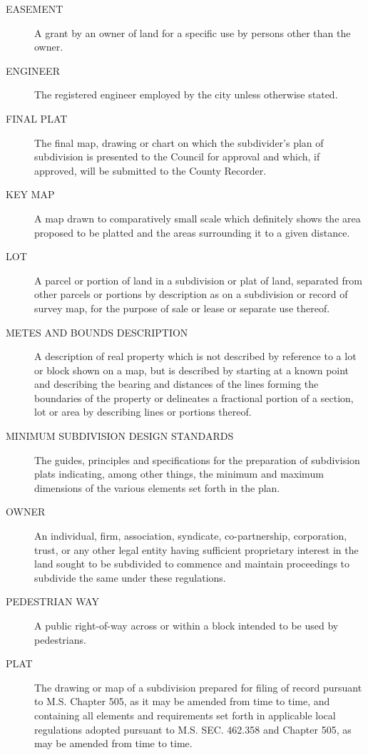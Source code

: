 \begin{description}
    \item[EASEMENT] A grant by an owner of land for a specific use by persons other than the owner.
    \item[ENGINEER] The registered engineer employed by the city unless otherwise stated.
    \item[FINAL PLAT] The final map, drawing or chart on which the subdivider’s plan of subdivision is presented to the Council for approval and which, if approved, will be submitted to the County Recorder.
    \item[KEY MAP] A map drawn to comparatively small scale which definitely shows the area proposed to be platted and the areas surrounding it to a given distance.
    \item[LOT] A parcel or portion of land in a subdivision or plat of land, separated from other parcels or portions by description as on a subdivision or record of survey map, for the purpose of sale or lease or separate use thereof.
    \item[METES AND BOUNDS DESCRIPTION] A description of real property which is not described by reference to a lot or block shown on a map, but is described by starting at a known point and describing the bearing and distances of the lines forming the boundaries of the property or delineates a fractional portion of a section, lot or area by describing lines or portions thereof.
    \item[MINIMUM SUBDIVISION DESIGN STANDARDS] The guides, principles and specifications for the preparation of subdivision plats indicating, among other things, the minimum and maximum dimensions of the various elements set forth in the plan.
    \item[OWNER] An individual, firm, association, syndicate, co-partnership, corporation, trust, or any other legal entity having sufficient proprietary interest in the land sought to be subdivided to commence and maintain proceedings to subdivide the same under these regulations.
    \item[PEDESTRIAN WAY] A public right-of-way across or within a block intended to be used by pedestrians.
    \item[PLAT] The drawing or map of a subdivision prepared for filing of record pursuant to M.S. Chapter 505, as it may be amended from time to time, and containing all elements and requirements set forth in applicable local regulations adopted pursuant to M.S. SEC. 462.358 and Chapter 505, as may be amended from time to time.

\end{description}
